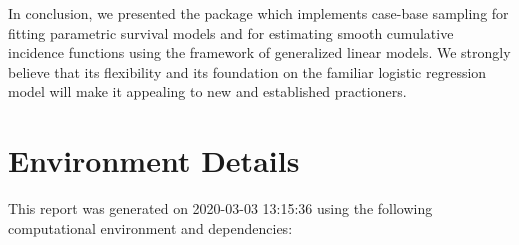 \documentclass[
]{jss}
\begin{document}
In conclusion, we presented the  package 
which implements case-base sampling for fitting parametric survival
models and for estimating smooth cumulative incidence functions using
the framework of generalized linear models. We strongly believe that its
flexibility and its foundation on the familiar logistic regression model
will make it appealing to new and established practioners.

\hypertarget{environment-details}{%
\section{Environment Details}\label{environment-details}}

This report was generated on 2020-03-03 13:15:36 using the following
computational environment and dependencies:
\end{document}
